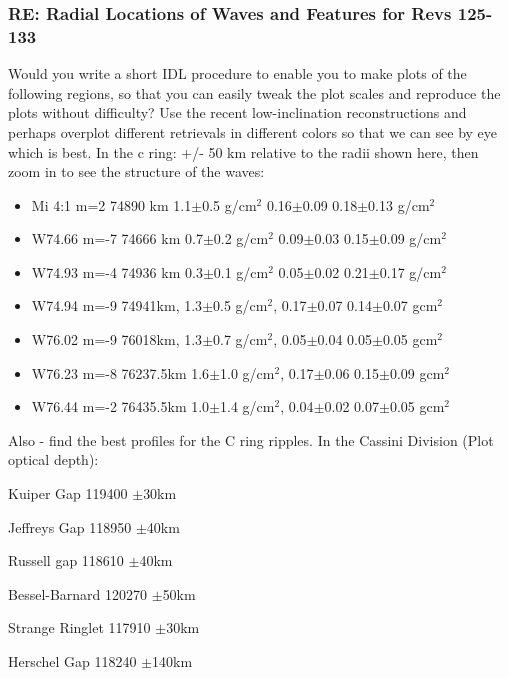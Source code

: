 \documentclass[crop=false,class=article,oneside]{standalone}
\begin{document}
\subsubsection{\footnotesize RE: Radial Locations of Waves and Features for Revs 125-133}
Would you write a short IDL procedure to enable you to make plots of the following regions, so that you can easily tweak the plot scales and reproduce the plots without difficulty? Use the recent low-inclination reconstructions and perhaps overplot different retrievals in different colors so that we can see by eye which is best. In the c ring: +/- 50 km relative to the radii shown here, then zoom in to see the structure of the waves:
\begin{itemize}
    \item Mi 4:1 m=2  74890 km  1.1$\pm$0.5 g/$\textrm{cm}^2$  0.16$\pm$0.09  0.18$\pm$0.13 g/$\textrm{cm}^2$
    \item W74.66 m=-7 74666 km  0.7$\pm$0.2 g/$\textrm{cm}^2$  0.09$\pm$0.03  0.15$\pm$0.09 g/$\textrm{cm}^2$
    \item W74.93 m=-4 74936 km  0.3$\pm$0.1 g/$\textrm{cm}^2$  0.05$\pm$0.02  0.21$\pm$0.17 g/$\textrm{cm}^2$
    \item W74.94 m=-9 74941km,  1.3$\pm$0.5 g/$\textrm{cm}^2$, 0.17$\pm$0.07  0.14$\pm$0.07 g$\textrm{cm}^2$
    \item W76.02 m=-9 76018km,  1.3$\pm$0.7 g/$\textrm{cm}^2$, 0.05$\pm$0.04  0.05$\pm$0.05 g$\textrm{cm}^2$
    \item W76.23 m=-8 76237.5km 1.6$\pm$1.0 g/$\textrm{cm}^2$, 0.17$\pm$0.06  0.15$\pm$0.09 g$\textrm{cm}^2$
    \item W76.44 m=-2 76435.5km 1.0$\pm$1.4 g/$\textrm{cm}^2$, 0.04$\pm$0.02  0.07$\pm$0.05 g$\textrm{cm}^2$
\end{itemize}
Also - find the best profiles for the C ring ripples. In the Cassini Division (Plot optical depth):
\begin{itemize}
\begin{multicols}{3}
    \item Kuiper Gap 119400 $\pm$30km
    \item Jeffreys Gap 118950 $\pm$40km
    \item Russell gap 118610 $\pm$40km
    \item Bessel-Barnard 120270 $\pm$50km
    \item Strange Ringlet 117910 $\pm$30km
    \item Herschel Gap 118240 $\pm$140km
\end{multicols}
\end{itemize}
\end{document}
